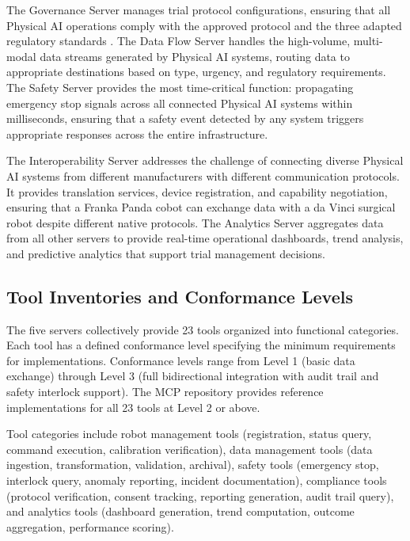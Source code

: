 The Governance Server manages trial protocol configurations, ensuring that all
Physical AI operations comply with the approved protocol and the three adapted
regulatory standards \cite{ich-adapt, cfr50-adapt, cfr312-adapt}. The Data
Flow Server handles the high-volume, multi-modal data streams generated by
Physical AI systems, routing data to appropriate destinations based on type,
urgency, and regulatory requirements. The Safety Server provides the most
time-critical function: propagating emergency stop signals across all connected
Physical AI systems within milliseconds, ensuring that a safety event detected
by any system triggers appropriate responses across the entire infrastructure.

The Interoperability Server addresses the challenge of connecting diverse
Physical AI systems from different manufacturers with different communication
protocols. It provides translation services, device registration, and
capability negotiation, ensuring that a Franka Panda cobot can exchange data
with a da Vinci surgical robot despite different native protocols. The
Analytics Server aggregates data from all other servers to provide real-time
operational dashboards, trend analysis, and predictive analytics that support
trial management decisions.

\subsection{Tool Inventories and Conformance Levels}
\label{subsec:mcp-tools}

The five servers collectively provide 23 tools organized into functional
categories. Each tool has a defined conformance level specifying the minimum
requirements for implementations. Conformance levels range from Level 1 (basic
data exchange) through Level 3 (full bidirectional integration with audit trail
and safety interlock support). The MCP repository \cite{mcp-repo} provides
reference implementations for all 23 tools at Level 2 or above.

Tool categories include robot management tools (registration, status query,
command execution, calibration verification), data management tools (data
ingestion, transformation, validation, archival), safety tools (emergency stop,
interlock query, anomaly reporting, incident documentation), compliance tools
(protocol verification, consent tracking, reporting generation, audit trail
query), and analytics tools (dashboard generation, trend computation, outcome
aggregation, performance scoring).

